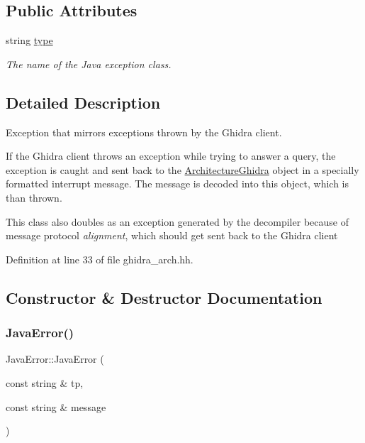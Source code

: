 \subsection*{Public Attributes}
\begin{DoxyCompactItemize}
\item 
string \mbox{\hyperlink{struct_java_error_a7b3350128bacf6f2828e9cf721460000}{type}}
\begin{DoxyCompactList}\small\item\em The name of the Java exception class. \end{DoxyCompactList}\end{DoxyCompactItemize}


\subsection{Detailed Description}
Exception that mirrors exceptions thrown by the Ghidra client. 

If the Ghidra client throws an exception while trying to answer a query, the exception is caught and sent back to the \mbox{\hyperlink{class_architecture_ghidra}{Architecture\+Ghidra}} object in a specially formatted interrupt message. The message is decoded into this object, which is than thrown.

This class also doubles as an exception generated by the decompiler because of message protocol {\itshape alignment}, which should get sent back to the Ghidra client 

Definition at line 33 of file ghidra\+\_\+arch.\+hh.



\subsection{Constructor \& Destructor Documentation}
\mbox{\label{struct_java_error_a91a61d19d9f4638ff503968f7f458dec}} 
\subsubsection{\texorpdfstring{JavaError()}{JavaError()}}
{\footnotesize\ttfamily Java\+Error\+::\+Java\+Error (\begin{DoxyParamCaption}\item[{const string \&}]{tp,  }\item[{const string \&}]{message }\end{DoxyParamCaption})\hspace{0.3cm}{\ttfamily [inline]}}




